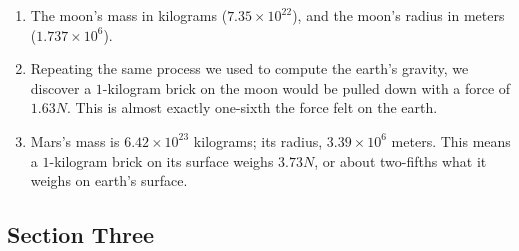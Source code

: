 \documentclass[12pt,letterpaper]{article}
\begin{document}
  \begin{enumerate}
  \item
    The moon's mass in kilograms ($7.35 \times 10^{22}$), and the
    moon's radius in meters ($1.737 \times 10^6$).
  \item
    Repeating the same process we used to compute the earth's gravity,
    we discover a $1$-kilogram brick on the moon would be pulled down
    with a force of $1.63N$.  This is almost exactly one-sixth the
    force felt on the earth.
  \item
    Mars's mass is $6.42 \times 10^{23}$ kilograms; its radius, $3.39
    \times 10^6$ meters.  This means a $1$-kilogram brick on its
    surface weighs $3.73N$, or about two-fifths what it weighs on earth's
    surface.
  \end{enumerate}

  \subsection{Section Three}
\end{document}
